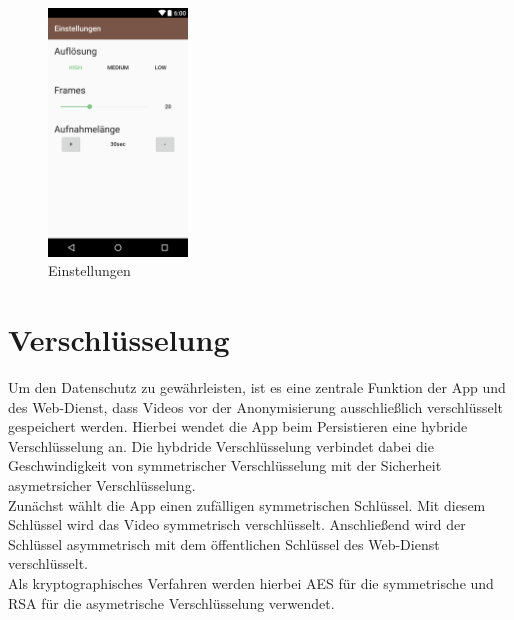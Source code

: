 \begin{figure}
	\centering
	\includegraphics[width=0.33\textwidth]{subtopicsFuncspec/Res/Mockups/Settings1.png}
 	 \caption{Einstellungen}
\end{figure}

\newpage

\section{Verschlüsselung} \label{sec:Verschlüsselung}

Um den Datenschutz zu gewährleisten, ist es eine zentrale Funktion der App und des Web-Dienst, dass Videos vor der Anonymisierung ausschließlich verschlüsselt gespeichert werden. Hierbei wendet die App beim Persistieren eine hybride Verschlüsselung an. Die hybdride Verschlüsselung verbindet dabei die Geschwindigkeit von symmetrischer Verschlüsselung mit der Sicherheit asymetrsicher Verschlüsselung.\\
Zunächst wählt die App einen zufälligen symmetrischen Schlüssel. Mit diesem Schlüssel wird das Video symmetrisch verschlüsselt. Anschließend wird der Schlüssel asymmetrisch mit dem öffentlichen Schlüssel des Web-Dienst verschlüsselt. \\
Als kryptographisches Verfahren werden hierbei AES für die symmetrische und RSA für die asymetrische Verschlüsselung verwendet.


